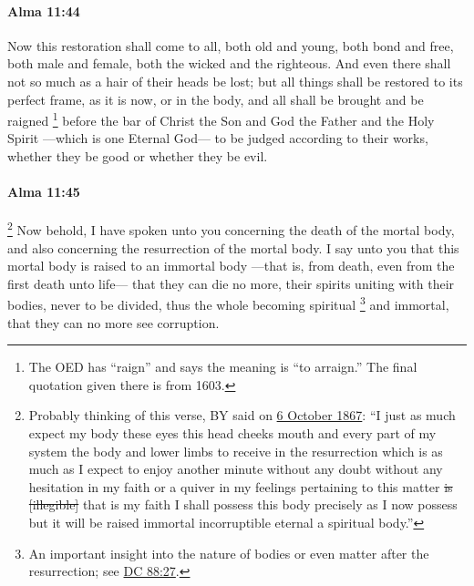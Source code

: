 		\paragraph{Alma 11:44} %
			\label{ALMA-11-44}

			Now this restoration shall come to all,
			both old and young, both bond and free, both male and female,
			both the wicked and the righteous.
			And even there shall not so much as a hair of their heads be lost;
			but all things shall be restored to its perfect frame,
			as it is now, or in the body,
			and all shall be brought and be raigned%
				\footnote{%
					The OED has ``raign'' and says the meaning is ``to arraign.'' The final quotation given there is from 1603.
					}
			before the bar of Christ the Son and God the Father and the Holy Spirit
			---which is one Eternal God---
			to be judged according to their works,
			whether they be good or whether they be evil.

		\paragraph{Alma 11:45} %
			\label{ALMA-11-45}
			
				\footnote{%
					Probably thinking of this verse, BY said on \href{https://drive.google.com/file/d/1wV-mRM932G6giTCQENRd8CTtRAMDGdxa/view?usp=sharing}{6 October 1867}: ``I just as much expect my body these eyes this head cheeks mouth and every part of my system the body and lower limbs to receive in the resurrection which is as much as I expect to enjoy another minute without any doubt without any hesitation in my faith or a quiver in my feelings pertaining to this matter \sout{is [illegible]} that is my faith I shall possess this body precisely as I now possess but it will be raised immortal incorruptible eternal a spiritual body.''
					}%
			Now behold, I have spoken unto you concerning the death of the mortal body,
			and also concerning the resurrection of the mortal body.
			I say unto you that this mortal body is raised to an immortal body
			---that is, from death, even from the first death unto life---
			that they can die no more,
			their spirits uniting with their bodies, never to be divided,
			thus the whole becoming spiritual%
				\footnote{%
					An important insight into the nature of bodies or even matter after the resurrection; see \hyperref[DC88-27]{DC 88:27}.
					}
			and immortal,
			that they can no more see corruption.

